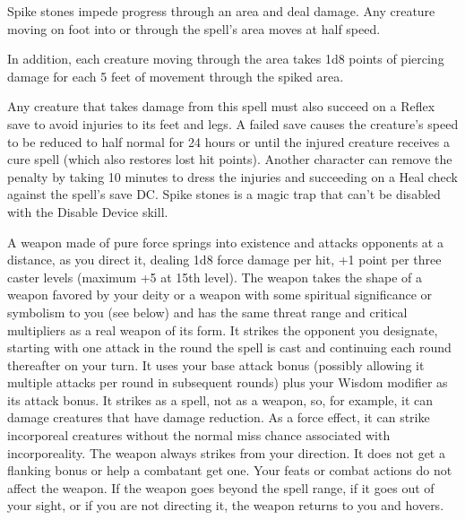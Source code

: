 \begin{multicols}{2}
\begin{small}
\smallskip\noindent Spike stones impede progress through an area and deal damage. Any creature moving on foot into or through the spell's area moves at half speed.

\smallskip\noindent In addition, each creature moving through the area takes 1d8 points of piercing damage for each 5 feet of movement through the spiked area.

\smallskip\noindent Any creature that takes damage from this spell must also succeed on a Reflex save to avoid injuries to its feet and legs. A failed save causes the creature's speed to be reduced to half normal for 24 hours or until the injured creature receives a cure spell (which also restores lost hit points). Another character can remove the penalty by taking 10 minutes to dress the injuries and succeeding on a Heal check against the spell's save DC.
Spike stones is a magic trap that can't be disabled with the Disable Device skill.


\noindent A weapon made of pure force springs into existence and attacks opponents at a distance, as you direct it, dealing 1d8 force damage per hit, +1 point per three caster levels (maximum +5 at 15th level). The weapon takes the shape of a weapon favored by your deity or a weapon with some spiritual significance or symbolism to you (see below) and has the same threat range and critical multipliers as a real weapon of its form. It strikes the opponent you designate, starting with one attack in the round the spell is cast and continuing each round thereafter on your turn. It uses your base attack bonus (possibly allowing it multiple attacks per round in subsequent rounds) plus your Wisdom modifier as its attack bonus. It strikes as a spell, not as a weapon, so, for example, it can damage creatures that have damage reduction. As a force effect, it can strike incorporeal creatures without the normal miss chance associated with incorporeality. The weapon always strikes from your direction. It does not get a flanking bonus or help a combatant get one. Your feats or combat actions do not affect the weapon. If the weapon goes beyond the spell range, if it goes out of your sight, or if you are not directing it, the weapon returns to you and hovers.


\end{small}
\end{multicols}
